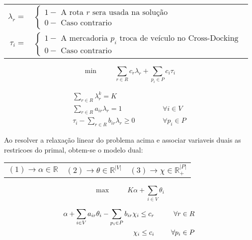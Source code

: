 \documentclass[12pt]{article}
\begin{document}
\begin{table}[!htb]
\begin{tabular}{rl}
\vspace{1mm}
$\lambda_r = $ &
$\left\{
\begin{array} {l}
1 - \textrm{ A rota } r \textrm{ sera usada na solu\c{c}\~ao} \\
0 - \textrm{ Caso contrario}
\end{array} \right.
$
\\
\vspace{1mm}
$\tau_i = $ &
$\left\{
\begin{array} {l}
1 - \textrm{ A mercadoria } p_i \textrm{ troca de ve\'iculo no Cross-Docking }\\
0 - \textrm{ Caso contrario }
\end{array} \right.
$
\end{tabular}
\end{table}

\[
\min \hspace{1cm} \sum\limits_{r \in R} {c_r \lambda_r} + \sum\limits_{p_i \in P} {c_i \tau_i}
\]

\begin{eqnarray}
\label{eqA1}
  \sum\limits_{r \in R} {\lambda^k_r} = K \\
\label{eqA2}
  \sum\limits_{r \in R} {a_{ir} \lambda_r} = 1 & \hspace{1cm} & \forall i \in V \\
\label{eqA3}
  \tau_i - \sum\limits_{r \in R} {b_{ir} \lambda_r} \ge 0 & \hspace{1cm} & \forall p_i \in P 
\end{eqnarray}

\vspace{3cm}

Ao resolver a relaxa\c{c}\~ao linear do problema acima e associar variaveis duais as restricoes do primal, obtem-se o modelo dual:
\begin{table}[!htb]
\begin{center}
\begin{tabular}{lll}
$(1) \rightarrow \alpha \in \mathbb{R}$ & $(2) \rightarrow \theta \in \mathbb{R}^{|V|}$ & $(3) \rightarrow \chi \in \mathbb{R}_+^{|P|}$ \\
\end{tabular}
\end{center}
\end{table}

\[
\max \hspace{1cm} K \alpha + \sum\limits_{i \in V}{\theta_i}
\]

\begin{small}
\begin{eqnarray}
\label{eqC01}
  \alpha + \sum\limits_{i \in V}{a_{ir} \theta_i} - \sum\limits_{p_i \in P}{b_{ir} \chi_i} \le c_r & \hspace{5mm} & \forall r \in R \\
\label{eqC02}
  \chi_i \le c_i & \hspace{5mm} & \forall p_i \in P 
\end{eqnarray}
\end{small}
\end{document}
